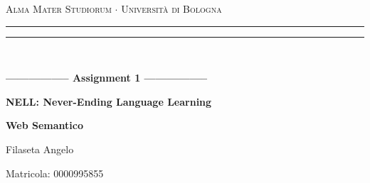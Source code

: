 \begin{titlepage}
    \begin{center}
        {{\Large{\textsc{Alma Mater Studiorum $\cdot$ Università di Bologna}}}}
        \rule[0.1cm]{15.8cm}{0.1mm}
        \rule[0.5cm]{15.8cm}{0.6mm}
        \\
        \vspace{3mm}
    \end{center}
    \vspace{2mm}
    \begin{center}
        {\LARGE{\bf{----------------- Assignment 1 -----------------}}}
        \vspace{5mm} \par \noindent
        {\Huge{\bf{NELL: Never-Ending Language Learning}}}
        \vspace{10mm} \par \noindent
        {\LARGE \textbf{Web Semantico}}
        \vspace{15mm} \par \noindent
        {\Large Filaseta Angelo}
        \vspace{10mm} \par \noindent
        {\Large Matricola: 0000995855}
    \end{center}
    \hfill
    \vspace{40mm}
\end{titlepage}
